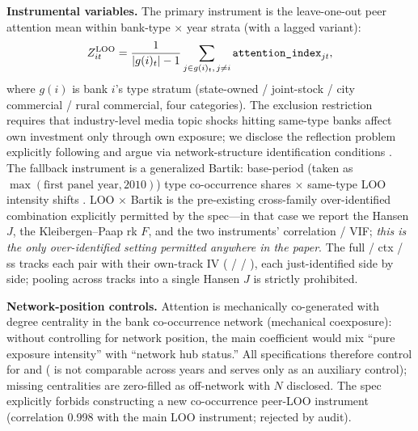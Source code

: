 \textbf{Instrumental variables.} The primary instrument is the leave-one-out
peer attention mean within bank-type $\times$ year strata (with a lagged
 variant):
\begin{equation}\label{eq:iv}
Z^{\mathrm{LOO}}_{it} = \frac{1}{|g(i)_t| - 1}
\sum_{j \in g(i)_t,\, j \neq i} \texttt{attention\_index}_{jt},
\end{equation}
where $g(i)$ is bank $i$'s type stratum (state-owned / joint-stock / city
commercial / rural commercial, four categories). The exclusion restriction
requires that industry-level media topic shocks hitting same-type banks affect
own investment only through own exposure; we disclose the reflection problem
explicitly following \textcite{manski1993reflection} and argue via
network-structure identification conditions \parencite{bramoulle2009peer}.
The fallback instrument is a generalized Bartik: base-period (taken as
$\max(\text{first panel year}, 2010)$) type co-occurrence shares $\times$
same-type LOO intensity shifts
\parencite{goldsmith2020bartik,borusyak2022shiftshare}. LOO $\times$ Bartik is
the pre-existing cross-family over-identified combination explicitly permitted
by the spec---in that case we report the Hansen $J$, the Kleibergen--Paap rk
$F$, and the two instruments' correlation / VIF; \emph{this is the only
over-identified setting permitted anywhere in the paper}. The full / ctx / ss
tracks each pair with their own-track IV
( /
 / ), each
just-identified side by side; pooling across tracks into a single Hansen $J$
is strictly prohibited.

\textbf{Network-position controls.} Attention is mechanically co-generated
with degree centrality in the bank co-occurrence network (mechanical
coexposure): without controlling for network position, the main coefficient
would mix ``pure exposure intensity'' with ``network hub status.'' All
specifications therefore control for  and
 ( is not comparable across
years and serves only as an auxiliary control); missing centralities are
zero-filled as off-network with $N$ disclosed. The spec explicitly forbids
constructing a new co-occurrence peer-LOO instrument (correlation 0.998 with
the main LOO instrument; rejected by audit).

